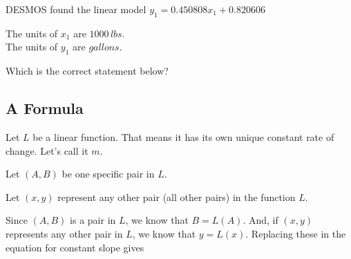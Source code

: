 \documentclass{ximera}
\begin{document}
\begin{question} 


DESMOS found the linear model $y_1 = 0.450808 x_1 + 0.820606$ 


The units of $x_1$ are $1000 \, lbs$. \\
The units of $y_1$ are $gallons$.



Which is the correct statement below?

\begin{multipleChoice}
\end{multipleChoice}


\end{question}






































\subsection*{A Formula}  


Let $L$ be a linear function.  That means it has its own unique constant rate of change.  Let's call it $m$. 

Let $(A, B)$ be one specific pair in $L$.


Let $(x, y)$ represent any other pair (all other pairs) in the function $L$. 






Since $(A, B)$ is a pair in $L$, we know that $B = L(A)$.  And, if $(x, y)$ represents any other pair in $L$, we know that $y = L(x)$.  Replacing these in the equation for constant slope gives
\end{document}
